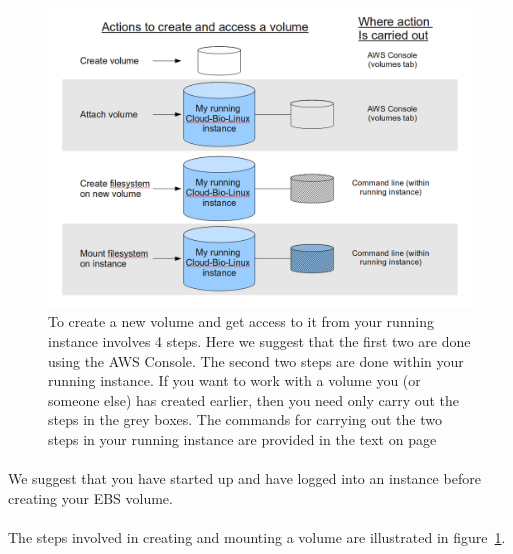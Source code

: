 \begin{figure}[!ht]
	\fbox
	{
		\begin{minipage}{13cm}
			\includegraphics[width=\maxwidth]{"images/createAndMountVol-1"}
			\caption[Attaching a volume]{\label{fig:createandmountvolume}To create a new volume and get access to it from your running instance involves 4 steps. Here we suggest that the first two are done using the AWS Console. The second two steps are done within your running instance. If you want to work with a volume you (or someone else) has created earlier, then you need only carry out the steps in the grey boxes. The commands for carrying out the two steps in your running instance are provided in the text on page \pageref{text:mounting}}
		\end{minipage}
	}
\end{figure}


\paragraph{}We suggest that you have started up and have logged into an instance before creating your EBS volume. 
\paragraph{}The steps involved in creating and mounting a volume are illustrated in figure~\ref{fig:createandmountvolume}.

